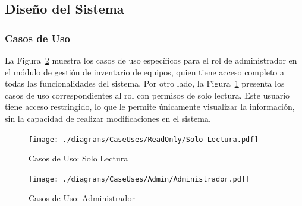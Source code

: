 \documentclass[stu, 12pt, letterpaper, donotrepeattitle, floatsintext, natbib]{apa7}
\begin{document}
\subsection{Diseño del Sistema}
\subsubsection{Casos de Uso}
La Figura~\ref{admin} muestra los casos de uso específicos para el rol de administrador en el módulo de gestión de inventario de equipos,
quien tiene acceso completo a todas las funcionalidades del sistema. Por otro lado, la Figura~\ref{readonly} presenta los casos de uso
correspondientes al rol con permisos de solo lectura. Este usuario tiene acceso restringido, lo que le permite únicamente visualizar la
información, sin la capacidad de realizar modificaciones en el sistema.
\begin{figure}[H]
    \centering
    \caption{Casos de Uso: Solo Lectura}\label{readonly}
    \texttt{[image: ./diagrams/CaseUses/ReadOnly/Solo Lectura.pdf]}
\end{figure}
\begin{figure}[H]
    \centering
    \caption{Casos de Uso: Administrador}\label{admin}
    \texttt{[image: ./diagrams/CaseUses/Admin/Administrador.pdf]}
\end{figure}
\end{document}
